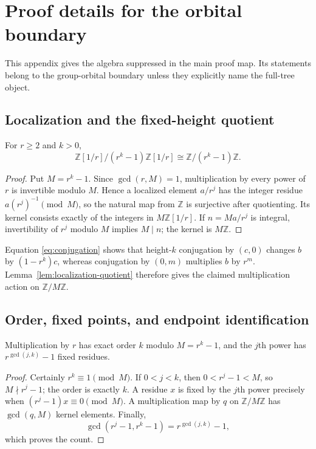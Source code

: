 \section{Proof details for the orbital boundary}
\label{app:proofs}

This appendix gives the algebra suppressed in the main proof map.  Its
statements belong to the group-orbital boundary unless they explicitly name
the full-tree object.

\subsection{Localization and the fixed-height quotient}

\begin{lemma}
\label{lem:localization-quotient}
For $r\ge2$ and $k>0$,
\[
 \mathbb Z[1/r]/(r^k-1)\mathbb Z[1/r]
 \cong \mathbb Z/(r^k-1)\mathbb Z.
\]
\end{lemma}

\begin{proof}
Put $M=r^k-1$.  Since $\gcd(r,M)=1$, multiplication by every power of $r$
is invertible modulo $M$.  Hence a localized element $a/r^j$ has the integer
residue $a(r^j)^{-1}\pmod M$, so the natural map from $\mathbb Z$ is
surjective after quotienting.  Its kernel consists exactly of the integers
in $M\mathbb Z[1/r]$.  If $n=M a/r^j$ is integral, invertibility of $r^j$
modulo $M$ implies $M\mid n$; the kernel is $M\mathbb Z$.
\end{proof}

Equation \eqref{eq:conjugation} shows that height-$k$ conjugation by
$(c,0)$ changes $b$ by $(1-r^k)c$, whereas conjugation by $(0,m)$ multiplies
$b$ by $r^m$.  Lemma~\ref{lem:localization-quotient} therefore gives the
claimed multiplication action on $\mathbb Z/M\mathbb Z$.

\subsection{Order, fixed points, and endpoint identification}

\begin{lemma}
\label{lem:mult-order}
Multiplication by $r$ has exact order $k$ modulo $M=r^k-1$, and the $j$th
power has $r^{\gcd(j,k)}-1$ fixed residues.
\end{lemma}

\begin{proof}
Certainly $r^k\equiv1\pmod M$.  If $0<j<k$, then
$0<r^j-1<M$, so $M\nmid r^j-1$; the order is exactly $k$.  A residue $x$
is fixed by the $j$th power precisely when
$(r^j-1)x\equiv0\pmod M$.  A multiplication map by $q$ on
$\mathbb Z/M\mathbb Z$ has $\gcd(q,M)$ kernel elements.  Finally,
\[
  \gcd(r^j-1,r^k-1)=r^{\gcd(j,k)}-1,
\]
which proves the count.
\end{proof}

